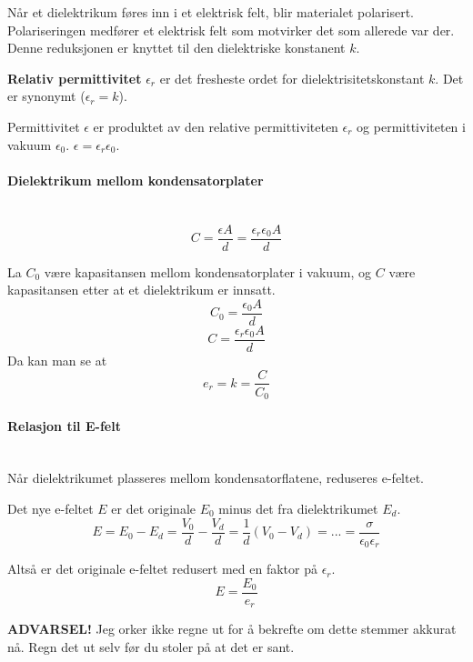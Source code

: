 Når et dielektrikum føres inn i et elektrisk felt, blir materialet polarisert.
Polariseringen medfører et elektrisk felt som motvirker det som
allerede var der.
Denne reduksjonen er knyttet til den dielektriske konstanent $k$.

\textbf{Relativ permittivitet} $\epsilon_r$ er det fresheste ordet for
dielektrisitetskonstant $k$.
Det er synonymt ($\epsilon_r = k$).

Permittivitet $\epsilon$ er produktet av den relative permittiviteten
$\epsilon_r$ og permittiviteten i vakuum $\epsilon_0$.
$\epsilon = \epsilon_r \epsilon_0$.



\paragraph{Dielektrikum mellom kondensatorplater} \hfill \\
$$C = \frac{\epsilon A}{d}
    = \frac{\epsilon_r \epsilon_0 A}{d}$$

La $C_0$ være kapasitansen mellom kondensatorplater i vakuum,
og $C$ være kapasitansen etter at et dielektrikum er innsatt.
$$C_0 = \frac{\epsilon_0 A}{d}$$
$$C = \frac{\epsilon_r \epsilon_0 A}{d}$$
Da kan man se at
$$e_r = k = \frac{C}{C_0}$$


\paragraph{Relasjon til E-felt} \hfill \\
Når dielektrikumet plasseres mellom kondensatorflatene, reduseres e-feltet.

Det nye e-feltet $E$ er det originale $E_0$ minus det fra dielektrikumet $E_d$.
$$E = E_0 - E_d
    = \frac{V_0}{d} - \frac{V_d}{d}
    = \frac{1}{d} (V_0 - V_d)
    = ...
    = \frac{\sigma}{\epsilon_0 \epsilon_r}$$

Altså er det originale e-feltet redusert med en faktor på $\epsilon_r$.
$$E = \frac{E_0}{e_r}$$

\textbf{ADVARSEL!} Jeg orker ikke regne ut for å bekrefte
om dette stemmer akkurat nå.
Regn det ut selv før du stoler på at det er sant.
